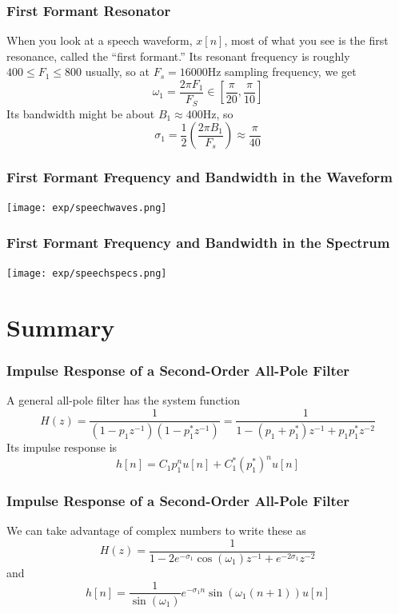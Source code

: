 \documentclass{beamer}
\begin{document}
\begin{frame}
  \frametitle{First Formant Resonator}

  When you look at a speech waveform, $x[n]$, most of what you see is
  the first resonance, called the ``first formant.''  Its resonant
  frequency is roughly $400\le F_1\le 800$ usually, so at $F_s=16000$Hz
  sampling frequency, we get
  \[
  \omega_1 = \frac{2\pi F_1}{F_S} \in \left[\frac{\pi}{20},\frac{\pi}{10}\right]
  \]
  Its bandwidth might be about $B_1\approx 400$Hz, so
  \[
  \sigma_1 = \frac{1}{2}\left(\frac{2\pi B_1}{F_s}\right) \approx \frac{\pi}{40}
  \]
\end{frame}

\begin{frame}
  \frametitle{First Formant Frequency and  Bandwidth in the Waveform}

  \centerline{\texttt{[image: exp/speechwaves.png]}}
\end{frame}


\begin{frame}
  \frametitle{First Formant Frequency and  Bandwidth in the Spectrum}

  \centerline{\texttt{[image: exp/speechspecs.png]}}
\end{frame}

\section[Summary]{Summary}
\setcounter{subsection}{1}

\begin{frame}
  \frametitle{Impulse Response of a Second-Order All-Pole Filter}

  A general all-pole filter has the system function
  \[
  H(z) = \frac{1}{(1-p_1z^{-1})(1-p_1^*z^{-1})}= \frac{1}{1-(p_1+p_1^*)z^{-1}+p_1p_1^*z^{-2}}
  \]
  Its impulse response is 
  \[
  h[n] = C_1p_1^n u[n] + C_1^* (p_1^*)^n u[n]
  \]
\end{frame}

\begin{frame}
  \frametitle{Impulse Response of a Second-Order All-Pole Filter}

  We can take advantage of complex numbers to write these as
  \[
  H(z) = \frac{1}{1-2e^{-\sigma_1}\cos(\omega_1)z^{-1}+ e^{-2\sigma_1}z^{-2}}
  \]
  and
  \[
  h[n] = \frac{1}{\sin(\omega_1)} e^{-\sigma_1n}\sin(\omega_1(n+1)) u[n]
  \]
\end{frame}
\end{document}
